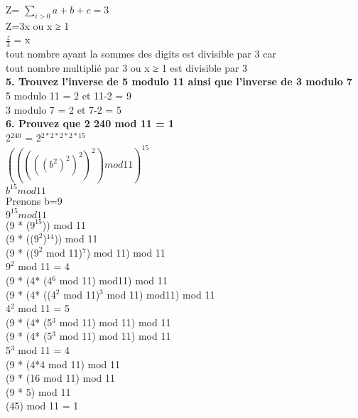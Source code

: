 Z= $\sum_{i>0} a+b+c=3 $ \\
Z=3x ou x ≥ 1 \\
$\frac{z}{3}$ = x \\

tout nombre ayant la sommes des digits est divisible par 3 car \\
tout nombre multiplié par 3 ou x ≥ 1 est divisible par 3 \\


\textbf{5. Trouvez l’inverse de 5 modulo 11 ainsi que l’inverse de 3 modulo 7} \\

5 modulo 11 = 2 et 11-2 = 9 \\

3 modulo 7 = 2 et 7-2 = 5 \\

\newpage
\textbf{6. Prouvez que 2 240 mod 11 = 1} \\

2$^{240}$ = 2$^{2*2*2*2*15}$ \\

$(((((b^{2})^{2})^{2})^{2}) mod 11)^{15}$ \\

$b^{15} mod 11$ \\

Prenons b=9 \\

$9^{15} mod 11$ \\

(9 * ($9^{15}$)) mod 11 \\

(9 * (($9^{2}$)$^{14}$)) mod 11 \\

(9 * (($9^{2}$ mod 11)$^{7}$) mod 11) mod 11 \\

$9^{2}$ mod 11 = 4 \\

(9 * (4* (4$^{6}$ mod 11) mod11) mod 11 \\

(9 * (4* ((4$^{2}$ mod 11)$^{3}$ mod 11) mod11) mod 11 \\

4$^{2}$ mod 11 = 5 \\

(9 * (4* (5$^{3}$ mod 11) mod 11) mod 11 \\

(9 * (4* (5$^{3}$ mod 11) mod 11) mod 11 \\

5$^{3}$ mod 11 = 4 \\

(9 * (4*4 mod 11) mod 11 \\

(9 * (16 mod 11) mod 11 \\

(9 * 5) mod 11 \\

(45) mod 11 = 1 \\
